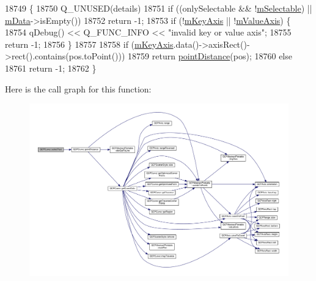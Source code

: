 \begin{DoxyCode}
18749                                                      \{
18750   Q\_UNUSED(details)
18751   if ((onlySelectable && !\hyperlink{class_q_c_p_abstract_plottable_aceee52342c8e75727abcbd164986fdcb}{mSelectable}) || \hyperlink{class_q_c_p_curve_a88d533e455bca96004b049e99168731b}{mData}->isEmpty())
18752     return -1;
18753   if (!\hyperlink{class_q_c_p_abstract_plottable_a426f42e254d0f8ce5436a868c61a6827}{mKeyAxis} || !\hyperlink{class_q_c_p_abstract_plottable_a2901452ca4aea911a1827717934a4bda}{mValueAxis}) \{
18754     qDebug() << Q\_FUNC\_INFO << \textcolor{stringliteral}{"invalid key or value axis"};
18755     \textcolor{keywordflow}{return} -1;
18756   \}
18757 
18758   \textcolor{keywordflow}{if} (\hyperlink{class_q_c_p_abstract_plottable_a426f42e254d0f8ce5436a868c61a6827}{mKeyAxis}.data()->axisRect()->rect().contains(pos.toPoint()))
18759     \textcolor{keywordflow}{return} \hyperlink{class_q_c_p_curve_acd7a68c6f268ce1ab845eaf69fc2c6a6}{pointDistance}(pos);
18760   \textcolor{keywordflow}{else}
18761     \textcolor{keywordflow}{return} -1;
18762 \}
\end{DoxyCode}


Here is the call graph for this function\+:\nopagebreak
\begin{figure}[H]
\begin{center}
\leavevmode
\includegraphics[width=350pt]{class_q_c_p_curve_a5af9949e725704811bbc81ecd5970b8e_cgraph}
\end{center}
\end{figure}


\hypertarget{class_q_c_p_curve_a631ac886708460013b30052f49cbc9da}{}
